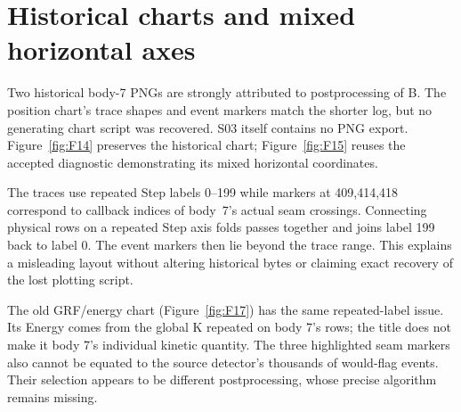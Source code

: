 \section{Historical charts and mixed horizontal axes}
Two historical body-7 PNGs are strongly attributed to postprocessing
of B. The position chart's trace shapes and event markers match
the shorter log, but no generating chart script was recovered.
S03 itself contains no PNG export. Figure~\ref{fig:F14} preserves
the historical chart; Figure~\ref{fig:F15} reuses the accepted
diagnostic demonstrating its mixed horizontal coordinates.

The traces use repeated Step labels 0--199 while markers at
409,414,418 correspond to callback indices of body~7's actual
seam crossings. Connecting physical rows on a repeated Step
axis folds passes together and joins label 199 back to label 0.
The event markers then lie beyond the trace range. This explains
a misleading layout without altering historical bytes or
claiming exact recovery of the lost plotting script.

The old GRF/energy chart (Figure~\ref{fig:F17}) has the same
repeated-label issue. Its Energy comes from the global K repeated
on body 7's rows; the title does not make it body 7's individual
kinetic quantity. The three highlighted seam markers also
cannot be equated to the source detector's thousands of
would-flag events. Their selection appears to be different
postprocessing, whose precise algorithm remains missing.
\FloatBarrier
